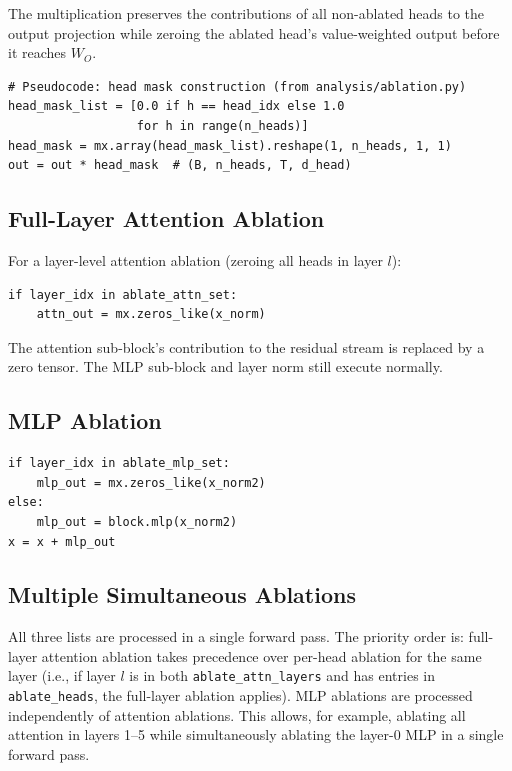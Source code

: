 The multiplication preserves the contributions of all non-ablated heads to the output projection
while zeroing the ablated head's value-weighted output before it reaches $W_O$.

\begin{verbatim}
# Pseudocode: head mask construction (from analysis/ablation.py)
head_mask_list = [0.0 if h == head_idx else 1.0
                  for h in range(n_heads)]
head_mask = mx.array(head_mask_list).reshape(1, n_heads, 1, 1)
out = out * head_mask  # (B, n_heads, T, d_head)
\end{verbatim}

\subsection{Full-Layer Attention Ablation}

For a layer-level attention ablation (zeroing all heads in layer $l$):

\begin{verbatim}
if layer_idx in ablate_attn_set:
    attn_out = mx.zeros_like(x_norm)
\end{verbatim}

The attention sub-block's contribution to the residual stream is replaced by a zero tensor.
The MLP sub-block and layer norm still execute normally.

\subsection{MLP Ablation}

\begin{verbatim}
if layer_idx in ablate_mlp_set:
    mlp_out = mx.zeros_like(x_norm2)
else:
    mlp_out = block.mlp(x_norm2)
x = x + mlp_out
\end{verbatim}

\subsection{Multiple Simultaneous Ablations}

All three lists are processed in a single forward pass. The priority order is:
full-layer attention ablation takes precedence over per-head ablation for the same layer
(i.e., if layer $l$ is in both \texttt{ablate\_attn\_layers} and has entries in
\texttt{ablate\_heads}, the full-layer ablation applies). MLP ablations are processed
independently of attention ablations. This allows, for example, ablating all attention
in layers 1--5 while simultaneously ablating the layer-0 MLP in a single forward pass.

